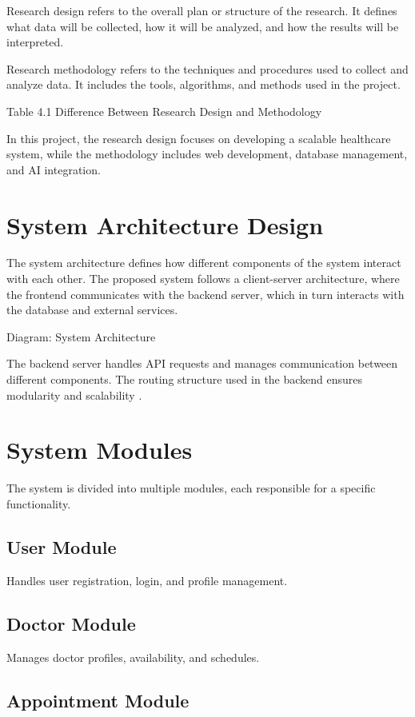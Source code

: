Research design refers to the overall plan or structure of the research. It defines what data will be collected, how it will be analyzed, and how the results will be interpreted.

Research methodology refers to the techniques and procedures used to collect and analyze data. It includes the tools, algorithms, and methods used in the project.

Table 4.1 Difference Between Research Design and Methodology

In this project, the research design focuses on developing a scalable healthcare system, while the methodology includes web development, database management, and AI integration.

\section{System Architecture Design}

The system architecture defines how different components of the system interact with each other. The proposed system follows a client-server architecture, where the frontend communicates with the backend server, which in turn interacts with the database and external services.

Diagram: System Architecture

The backend server handles API requests and manages communication between different components. The routing structure used in the backend ensures modularity and scalability .

\section{System Modules}

The system is divided into multiple modules, each responsible for a specific functionality.

\subsection{User Module}

Handles user registration, login, and profile management.

\subsection{Doctor Module}

Manages doctor profiles, availability, and schedules.

\subsection{Appointment Module}

